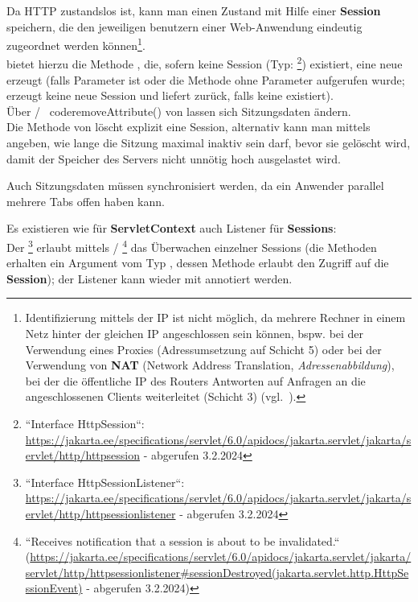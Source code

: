 Da HTTP zustandslos ist, kann man einen Zustand mit Hilfe einer \textbf{Session} speichern, die den jeweiligen benutzern einer Web-Anwendung eindeutig zugeordnet werden können\footnote{
Identifizierung mittels der IP ist nicht möglich, da mehrere Rechner in einem Netz hinter der gleichen IP angeschlossen sein können, bspw. bei der Verwendung eines Proxies (Adressumsetzung auf Schicht 5) oder bei der Verwendung von \textbf{NAT} (Network Address Translation, \textit{Adressenabbildung}), bei der die öffentliche IP des Routers Antworten auf Anfragen an die angeschlossenen Clients weiterleitet (Schicht 3) (vgl.~\cite[425]{Oec22}).
}.\\

\noindent
{} bietet hierzu die Methode , die, sofern keine Session (Typ: \footnote{
``Interface HttpSession``: \url{https://jakarta.ee/specifications/servlet/6.0/apidocs/jakarta.servlet/jakarta/servlet/http/httpsession} - abgerufen 3.2.2024
}) existiert, eine neue erzeugt (falls Parameter   ist oder die Methode ohne Parameter aufgerufen wurde;  erzeugt keine neue Session und liefert  zurück, falls keine existiert).\\

\noindent
Über  /  \ code{removeAttribute()} von  lassen sich Sitzungsdaten ändern.\\

\noindent
Die Methode  von  löscht explizit eine Session, alternativ kann man mittels  angeben, wie lange die Sitzung maximal inaktiv sein darf, bevor sie gelöscht wird, damit der Speicher des Servers nicht unnötig hoch ausgelastet wird.\\

\begin{tcolorbox}
Auch Sitzungsdaten müssen synchronisiert werden, da ein Anwender parallel mehrere Tabs offen haben kann.\\
\end{tcolorbox}

\noindent
Es existieren wie für \textbf{ServletContext} auch Listener für \textbf{Sessions}:\\
Der \footnote{
    ``Interface HttpSessionListener``: \url{https://jakarta.ee/specifications/servlet/6.0/apidocs/jakarta.servlet/jakarta/servlet/http/httpsessionlistener} - abgerufen 3.2.2024
} erlaubt mittels  / \footnote{``Receives notification that a session is about to be invalidated.`` (\url{https://jakarta.ee/specifications/servlet/6.0/apidocs/jakarta.servlet/jakarta/servlet/http/httpsessionlistener#sessionDestroyed(jakarta.servlet.http.HttpSessionEvent)} - abgerufen 3.2.2024)} das Überwachen einzelner Sessions (die Methoden erhalten ein Argument vom Typ , dessen Methode  erlaubt den Zugriff auf die \textbf{Session}); der Listener kann wieder mit  annotiert werden.\\

